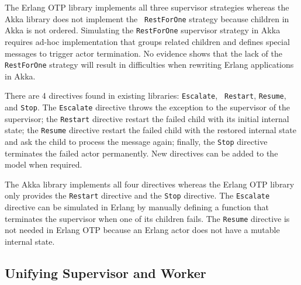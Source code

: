 The Erlang OTP library \citep{OTP} implements all three supervisor strategies 
whereas the Akka library \citep{akka_api, akka_doc} does not implement the {\tt 
RestForOne} strategy because children in Akka is not ordered.  Simulating the 
{\tt RestForOne} supervisor strategy in Akka requires ad-hoc implementation 
that groups related children and defines special messages to trigger actor 
termination.  No evidence shows that the lack of the {\tt RestForOne} 
strategy will result in difficulties when rewriting Erlang applications in Akka.

There are 4 directives found in existing libraries: {\tt Escalate}, {\tt 
Restart}, {\tt Resume}, and {\tt Stop}.  The {\tt Escalate} directive throws 
the exception to the supervisor of the supervisor; the {\tt Restart} directive 
restart the failed child with its initial internal state; the {\tt Resume} 
directive restart the failed child with the restored internal state and ask the 
child to process the message again; finally, the {\tt Stop} directive
terminates the failed actor permanently.  New directives can be added to the 
model when required.

The Akka library \citep{akka_api, akka_doc} implements all four directives 
whereas the Erlang OTP library \citep{OTP} only provides the {\tt Restart} 
directive and the {\tt Stop} directive.  The {\tt Escalate} directive can be 
simulated in Erlang by manually defining a function that terminates the 
supervisor when one of its children fails.  The {\tt Resume} directive is not 
needed in Erlang OTP because an Erlang actor does not have a mutable internal 
state.


\subsection{Unifying Supervisor and Worker}
\label{supervision_unifying}

